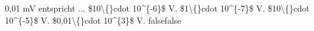     {0,01 mV entspricht ...}
    {\$10\textbackslash\{\}cdot 10\textasciicircum{}\{-6\}\$ V.}
    {\$1\textbackslash\{\}cdot 10\textasciicircum{}\{-7\}\$ V.}
    {\$10\textbackslash\{\}cdot 10\textasciicircum{}\{-5\}\$ V.}
    {\$0,01\textbackslash\{\}cdot 10\textasciicircum{}\{3\}\$ V.}
    {false}{false}